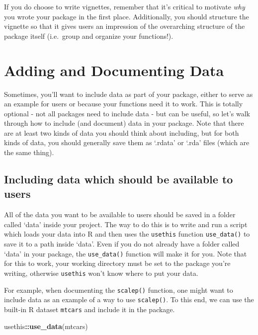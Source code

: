 \documentclass[]{book}
\newenvironment{Shaded}{\begin{snugshade}}{\end{snugshade}}
\newcommand{\KeywordTok}[1]{\textcolor[rgb]{0.13,0.29,0.53}{\textbf{#1}}}
\newcommand{\OperatorTok}[1]{\textcolor[rgb]{0.81,0.36,0.00}{\textbf{#1}}}
\newcommand{\NormalTok}[1]{#1}
\begin{document}
If you do choose to write vignettes, remember that it's critical to
motivate \emph{why} you wrote your package in the first place.
Additionally, you should structure the vignette so that it gives users
an impression of the overarching structure of the package itself
(i.e.~group and organize your functions!).

\section{Adding and Documenting Data}\label{adding-and-documenting-data}

Sometimes, you'll want to include data as part of your package, either
to serve as an example for users or because your functions need it to
work. This is totally optional - not all packages need to include data -
but can be useful, so let's walk through how to include (and document)
data in your package. Note that there are at least two kinds of data you
should think about including, but for both kinds of data, you should
generally save them as `.rdata' or `.rda' files (which are the same
thing).

\subsection{Including data which should be available to
users}\label{including-data-which-should-be-available-to-users}

All of the data you want to be available to users should be saved in a
folder called `data' inside your project. The way to do this is to write
and run a script which loads your data into R and then uses the
\texttt{usethis} function \texttt{use\_data()} to save it to a path
inside `data'. Even if you do not already have a folder called `data' in
your package, the \texttt{use\_data()} function will make it for you.
Note that for this to work, your working directory must be set to the
package you're writing, otherwise \texttt{usethis} won't know where to
put your data.

For example, when documenting the \texttt{scalep()} function, one might
want to include data as an example of a way to use \texttt{scalep()}. To
this end, we can use the built-in R dataset \texttt{mtcars} and include
it in the package.

\begin{Shaded}
\begin{Highlighting}[]
\NormalTok{usethis}\OperatorTok{::}\KeywordTok{use_data}\NormalTok{(mtcars)}
\end{Highlighting}
\end{Shaded}
\end{document}
